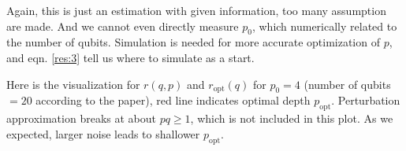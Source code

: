 \documentclass{article}
\begin{document}
Again, this is just an estimation with given information, too many assumption are made. And we cannot even directly measure $p_0$, which numerically related to the number of qubits. Simulation is needed for more accurate optimization of $p$, and eqn. \ref{res:3} tell us where to simulate as a start.

Here is the visualization for $r(q, p)$ and $r_\text{opt}(q)$ for $p_0 = 4$ (number of qubits $= 20$ according to the paper), red line indicates optimal depth $p_\text{opt}$. Perturbation approximation breaks at about $pq \geq 1$, which is not included in this plot. As we expected, larger noise leads to shallower $p_\text{opt}$.
\begin{figure}[h]
    \centering
    \qquad
\end{figure}
\end{document}
